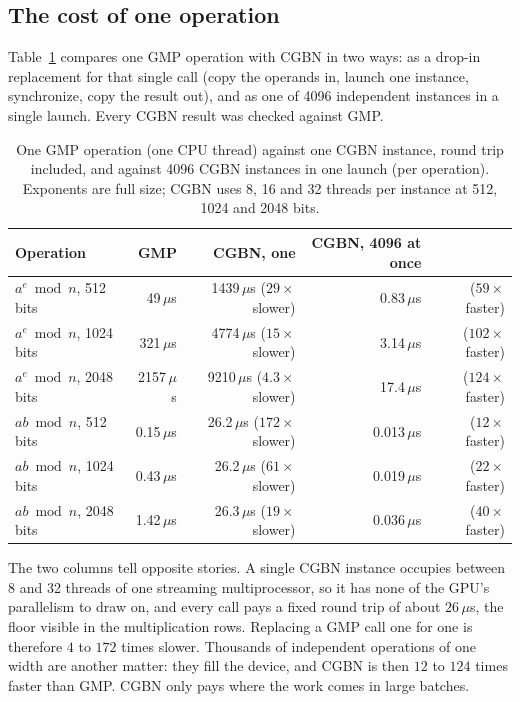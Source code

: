 \documentclass[11pt,a4paper]{article}
\begin{document}
\subsection{The cost of one operation}

Table~\ref{tab:cgbnlat} compares one GMP operation with CGBN in two ways: as a drop-in
replacement for that single call (copy the operands in, launch one instance, synchronize, copy
the result out), and as one of 4096 independent instances in a single launch. Every CGBN result
was checked against GMP.

\begin{table}[t]
\centering
\begin{tabular}{lrrrr}
\toprule
Operation & GMP & CGBN, one & CGBN, 4096 at once & \\
\midrule
$a^e \bmod n$, 512 bits  & 49\,$\mu$s   & 1439\,$\mu$s ($29\times$ slower) & 0.83\,$\mu$s & ($59\times$ faster) \\
$a^e \bmod n$, 1024 bits & 321\,$\mu$s  & 4774\,$\mu$s ($15\times$ slower) & 3.14\,$\mu$s & ($102\times$ faster) \\
$a^e \bmod n$, 2048 bits & 2157\,$\mu$s & 9210\,$\mu$s ($4.3\times$ slower) & 17.4\,$\mu$s & ($124\times$ faster) \\
$ab \bmod n$, 512 bits   & 0.15\,$\mu$s & 26.2\,$\mu$s ($172\times$ slower) & 0.013\,$\mu$s & ($12\times$ faster) \\
$ab \bmod n$, 1024 bits  & 0.43\,$\mu$s & 26.2\,$\mu$s ($61\times$ slower) & 0.019\,$\mu$s & ($22\times$ faster) \\
$ab \bmod n$, 2048 bits  & 1.42\,$\mu$s & 26.3\,$\mu$s ($19\times$ slower) & 0.036\,$\mu$s & ($40\times$ faster) \\
\bottomrule
\end{tabular}
\caption{One GMP operation (one CPU thread) against one CGBN instance, round trip included, and
  against 4096 CGBN instances in one launch (per operation). Exponents are full size; CGBN uses
  8, 16 and 32 threads per instance at 512, 1024 and 2048 bits.}
\label{tab:cgbnlat}
\end{table}

The two columns tell opposite stories. A single CGBN instance occupies between 8 and 32
threads of one streaming multiprocessor, so it has none of the GPU's parallelism to draw on, and
every call pays a fixed round trip of about $26\,\mu$s, the floor visible in the
multiplication rows. Replacing a GMP call one for one is therefore $4$ to $172$ times slower.
Thousands of independent operations of one width are another matter: they fill the device, and
CGBN is then $12$ to $124$ times faster than GMP. CGBN only pays where the work comes in large
batches.
\end{document}
